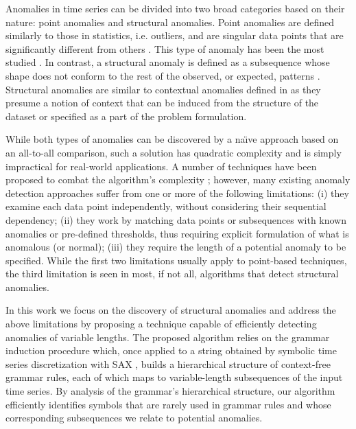 \documentclass{llncs}
\begin{document}
Anomalies in time series can be divided into two broad categories based on their nature: point anomalies and structural anomalies. Point anomalies are defined similarly to those in statistics, i.e. outliers, and are singular data points that are significantly different from others \cite{hawkins}. This type of anomaly has been the most studied \cite{chan_anomaly}. In contrast, a structural anomaly is defined as a subsequence whose shape does not conform to the rest of the observed, or expected, patterns \cite{hot_sax, outliers_survey}. Structural anomalies are similar to contextual anomalies defined in \cite{chan_anomaly} as they presume a notion of context that can be induced from the structure of the dataset or specified as a part of the problem formulation.

While both types of anomalies can be discovered by a na\"{\i}ve approach based on an all-to-all comparison, such a solution has quadratic complexity and is simply impractical for real-world applications. A number of techniques have been proposed to combat the algorithm's complexity \cite{outliers_survey, chan_anomaly}; however, many existing anomaly detection approaches suffer from one or more of the following limitations: (i) they examine each data point independently, without considering their sequential dependency; (ii) they work by matching data points or subsequences with known anomalies or pre-defined thresholds, thus requiring explicit formulation of what is anomalous (or normal); (iii) they require the length of a potential anomaly to be specified. While the first two limitations usually apply to point-based techniques, the third limitation is seen in most, if not all, algorithms that detect structural anomalies. 

In this work we focus on the discovery of structural anomalies and address the above limitations by proposing a technique capable of efficiently detecting anomalies of variable lengths. The proposed algorithm relies on the grammar induction procedure which, once applied to a string obtained by symbolic time series discretization with SAX \cite{sax}, builds a hierarchical structure of context-free grammar rules, each of which maps to variable-length subsequences of the input time series. By analysis of the grammar's hierarchical structure, our algorithm efficiently identifies symbols that are rarely used in grammar rules and whose corresponding subsequences we relate to potential anomalies. %
\end{document}
